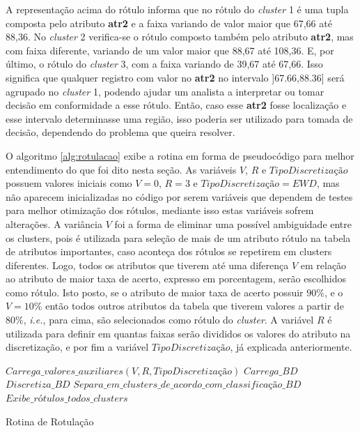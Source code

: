A representação acima do rótulo informa que no rótulo do \textit{cluster} 1 é uma tupla composta pelo atributo \textbf{atr2} e a faixa variando de valor maior que 67,66 até 88,36. No \textit{cluster} 2 verifica-se o rótulo composto também pelo atributo \textbf{atr2}, mas com faixa diferente, variando de um valor maior que 88,67 até 108,36. E, por último, o rótulo do \textit{cluster} 3, com a faixa variando de 39,67 até 67,66. Isso significa que qualquer registro com valor no \textbf{atr2} no intervalo ]67.66,88.36] será agrupado no \textit{cluster} 1, podendo ajudar um analista a interpretar ou tomar decisão em conformidade a esse rótulo. Então, caso esse \textbf{atr2} fosse localização e esse intervalo determinasse uma região, isso poderia ser utilizado para tomada de decisão, dependendo do problema que queira resolver. 

O algoritmo \ref{alg:rotulacao} exibe a rotina em forma de pseudocódigo para melhor entendimento do que foi dito nesta seção. As variáveis ${V}$, ${R}$ e ${TipoDiscretização}$ possuem valores iniciais como ${V=0}$, ${R=3}$ e ${TipoDiscretização=EWD}$, mas não aparecem inicializadas no código por serem variáveis que dependem de testes para melhor otimização dos rótulos, mediante isso estas variáveis sofrem alterações. A variância ${V}$ foi a forma de eliminar uma possível ambiguidade entre os clusters, pois é utilizada para seleção de mais de um atributo rótulo na tabela de atributos importantes, caso aconteça dos rótulos se repetirem em clusters diferentes. Logo, todos os atributos que tiverem até uma diferença ${V}$ em relação ao atributo de maior taxa de acerto, expresso em porcentagem, serão escolhidos como rótulo. Isto posto, se o atributo de maior taxa de acerto possuir ${90\%}$, e o ${V=10\%}$  então todos outros atributos da tabela que tiverem valores a partir de ${80\%}$, \textit{i.e.}, para cima, são selecionados como rótulo do \textit{cluster}. A variável ${R}$ é utilizada para definir em quantas faixas serão divididos os valores do atributo na discretização, e por fim a variável ${TipoDiscretização}$, já explicada anteriormente.

\IncMargin{1em}
\begin{algorithm}[h]

\nl $Carrega\_valores\_auxiliares(V,R,TipoDiscretização)$\;
\nl $Carrega\_BD$\; 
\nl $Discretiza\_BD$\; 
\nl $Separa\_em\_clusters\_de\_acordo\_com\_classificação\_BD$\; 
\nl {}
 \nl $Exibe\_rótulos\_todos\_clusters$\; 
 \caption{Rotina de Rotulação}\label{alg:rotulacao}
 
\end{algorithm}
\DecMargin{1em}
        
